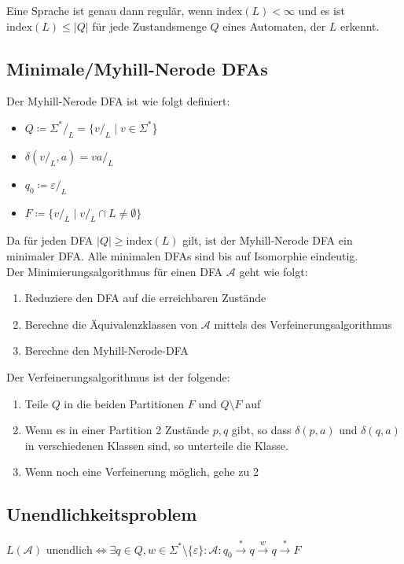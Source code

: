 \documentclass[11pt]{scrartcl}
\begin{document}
Eine Sprache ist genau dann regulär, wenn $\textrm{index}(L) < \infty$ und es ist $\textrm{index}(L) \leq \vert Q\vert$ für jede Zustandsmenge $Q$ eines Automaten, der $L$ erkennt.

\subsection{Minimale/Myhill-Nerode DFAs}
Der Myhill-Nerode DFA ist wie folgt definiert:
\begin{itemize}
	\item{$Q \coloneqq \Sigma^*/_L = \{v/_L\mid v \in \Sigma^*$\}}
	\item{$\delta(v/_L, a) = va/_L$}
	\item{$q_0 \coloneqq \varepsilon/_L$}
	\item{$F \coloneqq \{v/_L \mid v/_L \cap L \neq \emptyset\}$}
\end{itemize}

Da für jeden DFA $\mid Q\mid \geq \textrm{index}(L)$ gilt, ist der Myhill-Nerode DFA ein minimaler DFA. Alle minimalen DFAs sind bis auf Isomorphie eindeutig. \\

Der Minimierungsalgorithmus für einen DFA $\mathcal{A}$ geht wie folgt:
\begin{enumerate}
	\item{Reduziere den DFA auf die erreichbaren Zustände}
	\item{Berechne die Äquivalenzklassen von $\mathcal{A}$ mittels des Verfeinerungsalgorithmus}
	\item{Berechne den Myhill-Nerode-DFA}
\end{enumerate}

Der Verfeinerungsalgorithmus ist der folgende:
\begin{enumerate}
	\item{Teile $Q$ in die beiden Partitionen $F$ und $Q\setminus F$ auf}
	\item{Wenn es in einer Partition 2 Zustände $p,q$ gibt, so dass $\delta(p,a)$ und $\delta(q,a)$ in verschiedenen Klassen sind, so unterteile die Klasse.}
	\item{Wenn noch eine Verfeinerung möglich, gehe zu 2}
\end{enumerate}

\subsection{Unendlichkeitsproblem}
$L(\mathcal{A}) \text{ unendlich} \Leftrightarrow \exists q \in Q, w \in \Sigma^*\setminus \{\varepsilon\}: \mathcal{A}:  q_0 \stackrel{\ast}{\rightarrow} q \stackrel{w}{\rightarrow} q \stackrel{\ast}{\rightarrow}F$
\end{document}
